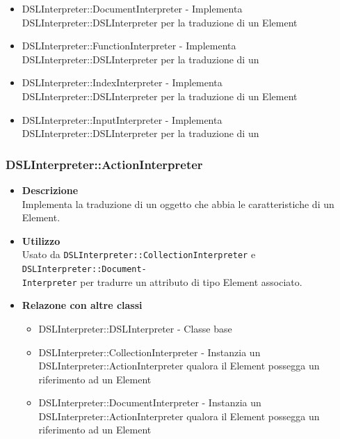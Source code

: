 \begin{itemize}
\begin{itemize}
  \item DSLInterpreter::DocumentInterpreter - Implementa DSLInterpreter::DSLInterpreter per la traduzione di un  Element
  \item DSLInterpreter::FunctionInterpreter - Implementa DSLInterpreter::DSLInterpreter per la traduzione di un 
  \item DSLInterpreter::IndexInterpreter - Implementa DSLInterpreter::DSLInterpreter per la traduzione di un  Element
  \item DSLInterpreter::InputInterpreter - Implementa DSLInterpreter::DSLInterpreter per la traduzione di un 
  \end{itemize}
\end{itemize}

\subsubsection{DSLInterpreter::ActionInterpreter}
\begin{itemize}
\item \textbf{Descrizione} \hfill \\
Implementa la traduzione di un oggetto che abbia le caratteristiche di un  Element.
\item \textbf{Utilizzo} \hfill \\
Usato da \texttt{DSLInterpreter::CollectionInterpreter} e \texttt{DSLInterpreter::Document-}\\\texttt{Interpreter} per tradurre un attributo di tipo  Element associato.
\item \textbf{Relazone con altre classi}
\begin{itemize}
\item DSLInterpreter::DSLInterpreter - Classe base
\item DSLInterpreter::CollectionInterpreter - Instanzia un DSLInterpreter::ActionInterpreter qualora il  Element possegga un riferimento ad un  Element
\item DSLInterpreter::DocumentInterpreter - Instanzia un DSLInterpreter::ActionInterpreter qualora il  Element possegga un riferimento ad un  Element
\end{itemize}
\end{itemize}

